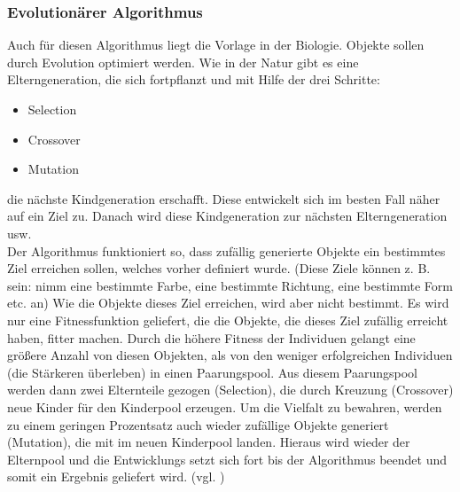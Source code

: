 \documentclass[../mciAusarbeitung.tex]{subfiles}
\begin{document}
		\subsubsection{Evolutionärer Algorithmus}
		Auch für diesen Algorithmus liegt die Vorlage in der Biologie. Objekte sollen durch Evolution optimiert werden. Wie in der Natur gibt es eine Elterngeneration, die sich fortpflanzt und mit Hilfe der drei Schritte:
		\begin{itemize}
			\item Selection
			\item Crossover
			\item Mutation
		\end{itemize}
		die nächste Kindgeneration erschafft. Diese entwickelt sich im besten Fall näher auf ein Ziel zu. Danach wird diese Kindgeneration zur nächsten Elterngeneration usw.\\
		Der Algorithmus funktioniert so, dass zufällig generierte Objekte ein bestimmtes Ziel erreichen sollen, welches vorher definiert wurde. (Diese Ziele können z. B. sein: nimm eine bestimmte Farbe, eine bestimmte Richtung, eine bestimmte Form etc. an) Wie die Objekte dieses Ziel erreichen, wird aber nicht bestimmt. Es wird nur eine Fitnessfunktion geliefert, die die Objekte, die dieses Ziel zufällig erreicht haben, fitter machen. Durch die höhere Fitness der Individuen gelangt eine größere Anzahl von diesen Objekten, als von den weniger erfolgreichen Individuen (die Stärkeren überleben) in einen Paarungspool. Aus diesem Paarungspool werden dann zwei Elternteile gezogen (Selection), die durch Kreuzung (Crossover) neue Kinder für den Kinderpool erzeugen.
		Um die Vielfalt zu bewahren, werden zu einem geringen Prozentsatz auch wieder zufällige Objekte generiert (Mutation), die mit im neuen Kinderpool landen. Hieraus wird wieder der Elternpool und die Entwicklungs setzt sich fort bis der Algorithmus beendet und somit ein Ergebnis geliefert wird. (vgl. \cite{house2016autonomous})\\
\end{document}
